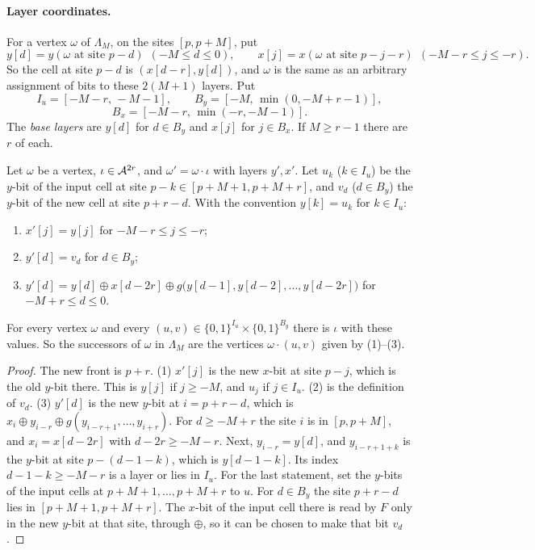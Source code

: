 \paragraph{Layer coordinates.} For a vertex $\omega$ of $\Lambda_M$, on the sites $[p,p+M]$, put
\[
y[d]=y(\omega\text{ at site }p-d)\ \ (-M\le d\le0),\qquad x[j]=x(\omega\text{ at site }p-j-r)\ \ (-M-r\le j\le-r).
\]
So the cell at site $p-d$ is $(x[d-r],y[d])$, and $\omega$ is the same as an arbitrary assignment of bits to these $2(M+1)$ layers. Put
\[
I_u=[-M-r,\,-M-1],\qquad B_y=[-M,\,\min(0,-M+r-1)],
\]
\[
B_x=[-M-r,\,\min(-r,-M-1)].
\]
The \emph{base layers} are $y[d]$ for $d\in B_y$ and $x[j]$ for $j\in B_x$. If $M\ge r-1$ there are $r$ of each.

\begin{lemma}\label{gen:lem:layer}
Let $\omega$ be a vertex, $\iota\in\mathcal{A}^{2r}$, and $\omega'=\omega\cdot\iota$ with layers $y',x'$. Let $u_k$ ($k\in I_u$) be the $y$-bit of the input cell at site $p-k\in[p+M+1,p+M+r]$, and $v_d$ ($d\in B_y$) the $y$-bit of the new cell at site $p+r-d$. With the convention $y[k]=u_k$ for $k\in I_u$:
\begin{enumerate}
\item $x'[j]=y[j]$ for $-M-r\le j\le-r$;
\item $y'[d]=v_d$ for $d\in B_y$;
\item $y'[d]=y[d]\oplus x[d-2r]\oplus g\bigl(y[d-1],y[d-2],\dots,y[d-2r]\bigr)$ for $-M+r\le d\le0$.
\end{enumerate}
For every vertex $\omega$ and every $(u,v)\in\{0,1\}^{I_u}\times\{0,1\}^{B_y}$ there is $\iota$ with these values. So the successors of $\omega$ in $\Lambda_M$ are the vertices $\omega\cdot(u,v)$ given by (1)--(3).
\end{lemma}

\begin{proof}
The new front is $p+r$. (1) $x'[j]$ is the new $x$-bit at site $p-j$, which is the old $y$-bit there. This is $y[j]$ if $j\ge-M$, and $u_j$ if $j\in I_u$. (2) is the definition of $v_d$. (3) $y'[d]$ is the new $y$-bit at $i=p+r-d$, which is $x_i\oplus y_{i-r}\oplus g(y_{i-r+1},\dots,y_{i+r})$. For $d\ge-M+r$ the site $i$ is in $[p,p+M]$, and $x_i=x[d-2r]$ with $d-2r\ge-M-r$. Next, $y_{i-r}=y[d]$, and $y_{i-r+1+k}$ is the $y$-bit at site $p-(d-1-k)$, which is $y[d-1-k]$. Its index $d-1-k\ge-M-r$ is a layer or lies in $I_u$. For the last statement, set the $y$-bits of the input cells at $p+M+1,\dots,p+M+r$ to $u$. For $d\in B_y$ the site $p+r-d$ lies in $[p+M+1,p+M+r]$. The $x$-bit of the input cell there is read by $F$ only in the new $y$-bit at that site, through $\oplus$, so it can be chosen to make that bit $v_d$.
\end{proof}


